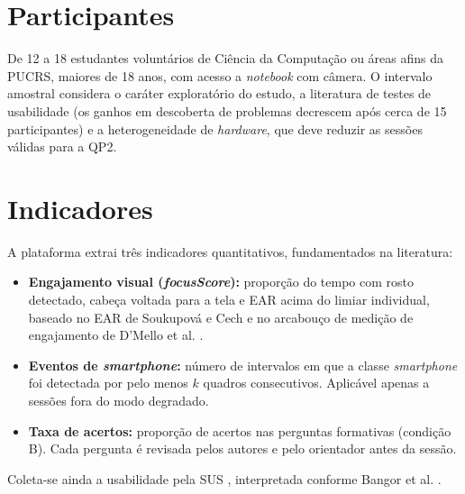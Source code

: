 \documentclass[portuguese,oneside]{tcc}
\begin{document}
\section{Participantes}
De 12 a 18 estudantes voluntários de Ciência da Computação ou áreas afins da PUCRS, maiores de 18 anos, com acesso a \emph{notebook} com câmera. O intervalo amostral considera o caráter exploratório do estudo, a literatura de testes de usabilidade \cite{Nie00} (os ganhos em descoberta de problemas decrescem após cerca de 15 participantes) e a heterogeneidade de \emph{hardware}, que deve reduzir as sessões válidas para a QP2.

\section{Indicadores}
A plataforma extrai três indicadores quantitativos, fundamentados na literatura:
\begin{itemize}
  \item \textbf{Engajamento visual (\emph{focusScore}):} proporção do tempo com rosto detectado, cabeça voltada para a tela e EAR acima do limiar individual, baseado no EAR de Soukupová e Cech \cite{SC16} e no arcabouço de medição de engajamento de D'Mello et al. \cite{DDD17}.
  \item \textbf{Eventos de \emph{smartphone}:} número de intervalos em que a classe \emph{smartphone} foi detectada por pelo menos $k$ quadros consecutivos. Aplicável apenas a sessões fora do modo degradado.
  \item \textbf{Taxa de acertos:} proporção de acertos nas perguntas formativas (condição B). Cada pergunta é revisada pelos autores e pelo orientador antes da sessão.
\end{itemize}
Coleta-se ainda a usabilidade pela SUS \cite{Bro96}, interpretada conforme Bangor et al. \cite{BKM08}.
\end{document}

